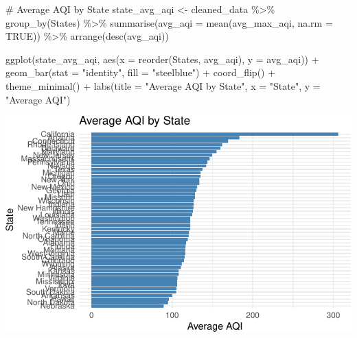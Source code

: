 \documentclass[
  12pt,
]{article}
\newenvironment{Shaded}{\begin{snugshade}}{\end{snugshade}}
\newcommand{\AttributeTok}[1]{\textcolor[rgb]{0.40,0.45,0.13}{#1}}
\newcommand{\CommentTok}[1]{\textcolor[rgb]{0.37,0.37,0.37}{#1}}
\newcommand{\ConstantTok}[1]{\textcolor[rgb]{0.56,0.35,0.01}{#1}}
\newcommand{\FunctionTok}[1]{\textcolor[rgb]{0.28,0.35,0.67}{#1}}
\newcommand{\NormalTok}[1]{\textcolor[rgb]{0.00,0.23,0.31}{#1}}
\newcommand{\OtherTok}[1]{\textcolor[rgb]{0.00,0.23,0.31}{#1}}
\newcommand{\SpecialCharTok}[1]{\textcolor[rgb]{0.37,0.37,0.37}{#1}}
\newcommand{\StringTok}[1]{\textcolor[rgb]{0.13,0.47,0.30}{#1}}
\begin{document}
\begin{Shaded}
\begin{Highlighting}[]
\CommentTok{\# Average AQI by State}
\NormalTok{state\_avg\_aqi }\OtherTok{\textless{}{-}}\NormalTok{ cleaned\_data }\SpecialCharTok{\%\textgreater{}\%}
  \FunctionTok{group\_by}\NormalTok{(States) }\SpecialCharTok{\%\textgreater{}\%}
  \FunctionTok{summarise}\NormalTok{(}\AttributeTok{avg\_aqi =} \FunctionTok{mean}\NormalTok{(avg\_max\_aqi, }\AttributeTok{na.rm =} \ConstantTok{TRUE}\NormalTok{)) }\SpecialCharTok{\%\textgreater{}\%}
  \FunctionTok{arrange}\NormalTok{(}\FunctionTok{desc}\NormalTok{(avg\_aqi))}

\FunctionTok{ggplot}\NormalTok{(state\_avg\_aqi, }\FunctionTok{aes}\NormalTok{(}\AttributeTok{x =} \FunctionTok{reorder}\NormalTok{(States, avg\_aqi), }\AttributeTok{y =}\NormalTok{ avg\_aqi)) }\SpecialCharTok{+}
  \FunctionTok{geom\_bar}\NormalTok{(}\AttributeTok{stat =} \StringTok{"identity"}\NormalTok{, }\AttributeTok{fill =} \StringTok{"steelblue"}\NormalTok{) }\SpecialCharTok{+}
  \FunctionTok{coord\_flip}\NormalTok{() }\SpecialCharTok{+}
  \FunctionTok{theme\_minimal}\NormalTok{() }\SpecialCharTok{+}
  \FunctionTok{labs}\NormalTok{(}\AttributeTok{title =} \StringTok{"Average AQI by State"}\NormalTok{, }\AttributeTok{x =} \StringTok{"State"}\NormalTok{, }\AttributeTok{y =} \StringTok{"Average AQI"}\NormalTok{)}
\end{Highlighting}
\end{Shaded}

\includegraphics{final_main_quarto_presentation_files/figure-pdf/unnamed-chunk-5-1.pdf}
\end{document}
